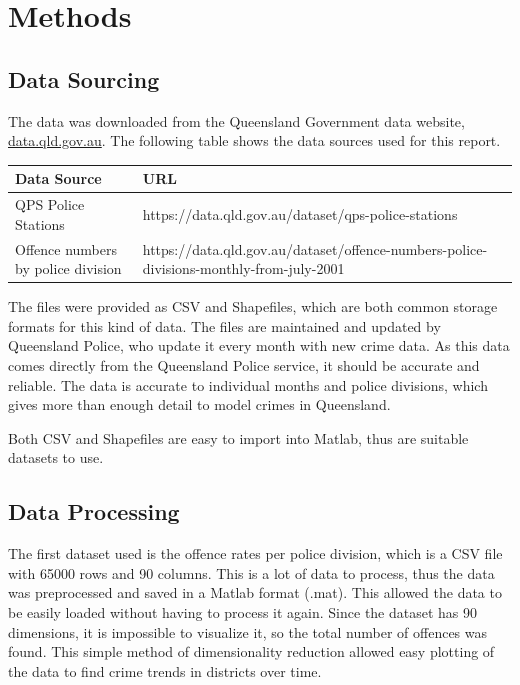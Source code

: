 \documentclass[]{article}
\begin{document}
\section{Methods}

\subsection{Data Sourcing}

The data was downloaded from the Queensland Government data website, \url{data.qld.gov.au}. 
The following table shows the data sources used for this report.

\begin{table}
    \centering
    \begin{tabular}{|p{4cm}|p{10cm}|}
        \hline
        Data Source & URL \\
        \hline
        QPS Police Stations & https://data.qld.gov.au/dataset/qps-police-stations \\ 
        Offence numbers by police division & https://data.qld.gov.au/dataset/offence-numbers-police-divisions-monthly-from-july-2001 \\
        \hline
    \end{tabular}
\end{table}

The files were provided as CSV and Shapefiles, which are both common storage formats for this kind of data.
The files are maintained and updated by Queensland Police, who update it every month with new crime data.
As this data comes directly from the Queensland Police service, it should be accurate and reliable.
The data is accurate to individual months and police divisions, which gives more than enough detail to model crimes in Queensland.

Both CSV and Shapefiles are easy to import into Matlab, thus are suitable datasets to use.

\subsection{Data Processing}

The first dataset used is the offence rates per police division\cite{noauthor_offence_nodate}, which is a CSV file with 65000 rows and 90 columns.
This is a lot of data to process, thus the data was preprocessed and saved in a Matlab format (.mat).
This allowed the data to be easily loaded without having to process it again.
Since the dataset has 90 dimensions, it is impossible to visualize it, so the total number of offences was found.
This simple method of dimensionality reduction allowed easy plotting of the data to find crime trends in districts over time.
\end{document}
